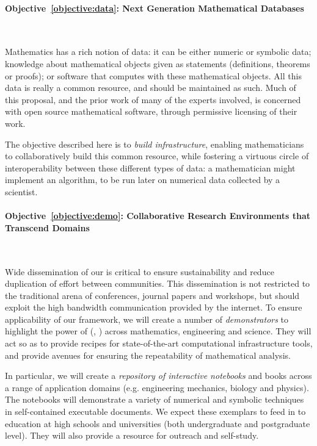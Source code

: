\documentclass[noworkareas,deliverables,\classoptions]{euproposal}       %
\begin{document}
\begin{proposal}
\paragraph{Objective~\ref{objective:data}: Next Generation Mathematical Databases}\

Mathematics has a rich notion of data: it can be either
numeric or symbolic data; knowledge about mathematical objects given as
statements (definitions, theorems or proofs); or software that computes
with these mathematical objects.
%
All this data is really a common resource, and should be maintained as
such. Much of this proposal, and the prior work of many of the experts
involved, is concerned with open source mathematical software, through
permissive licensing of their work.

The objective described here is to \emph{build infrastructure},
enabling mathematicians to collaboratively build this common resource,
while fostering a virtuous circle of interoperability between these
different types of data: a mathematician might implement an
algorithm, to be run later on numerical data collected by a
scientist.

\paragraph{Objective~\ref{objective:demo}: Collaborative Research Environments that Transcend Domains}\

Wide dissemination of our \VREs is critical to ensure sustainability
and reduce duplication of effort between communities. This
dissemination is not restricted to the traditional arena of
conferences, journal papers and workshops, but should exploit the high
bandwidth communication provided by the internet. To ensure
applicability of our framework, we will create a number of
\emph{demonstrators} to highlight the power of \TheProject{}
(, ) across mathematics,
engineering and science. They will act so as to provide recipes for
state-of-the-art computational infrastructure tools, and provide
avenues for ensuring the repeatability of mathematical analysis.

In particular, we will create a \emph{repository of interactive
  notebooks}  and books across a range
of application domains (e.g. engineering mechanics, biology and
physics). The notebooks will demonstrate a variety of numerical and
symbolic techniques in self-contained executable documents. We expect
these exemplars to feed in to education at high schools and
universities (both undergraduate and postgraduate level). They will
also provide a resource for outreach and self-study.


\end{proposal}
\end{document}
